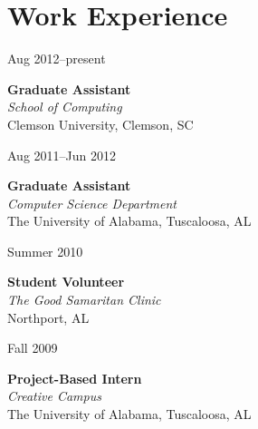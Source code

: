 \documentclass[11pt]{simplecv}
\newcommand{\stitle}{\textbf}
\newcommand{\splace}{\textit}
\newif\ifcv
\begin{document}
\section{Work Experience} 

\begin{topic}

\item[Aug 2012--present] {
  \stitle{Graduate Assistant} \\
  \splace{School of Computing} \\
  Clemson University, Clemson, SC

\ifcv
  \begin{itemize}
    \item Maintained and developed software for School of Computing Linux systems
    \item Led lab and graded for an intermediate programming course.
  \end{itemize}
\fi
}

\item[Aug 2011--Jun 2012] {
  \stitle{Graduate Assistant} \\
  \splace{Computer Science Department} \\
  The University of Alabama, Tuscaloosa, AL

\ifcv
  \begin{itemize}
    \item Research in robotics software/middleware
    \item Lectured and graded for undergraduate data structures/algorithms course.
    \item Graded for undergraduate/graduate algorithms course.
    \item Lectured and graded for Programming II course.
  \end{itemize}
\fi
}

\item[Summer 2010] {
	\stitle{Student Volunteer} \\
	\splace{The Good Samaritan Clinic} \\
	Northport, AL

\ifcv
	\begin{itemize}
		\item Performed triage procedures for incoming patients.
	\end{itemize}
\fi
}

\item [Fall 2009] {
	\stitle{Project-Based Intern} \\
	\splace{Creative Campus} \\
	The University of Alabama, Tuscaloosa, AL
	
}
\end{topic}
\end{document}
